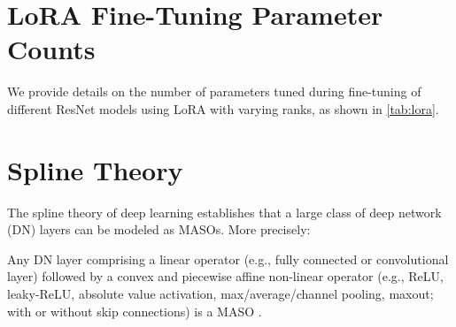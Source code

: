 \section{LoRA Fine-Tuning Parameter Counts}
We provide details on the number of parameters tuned during fine-tuning of different ResNet models using LoRA with varying ranks, as shown in \cref{tab:lora}.

\begin{table}[h]
\caption{\small Number of parameters to be tuned during fine-tuning of different ResNet models (total parameters shown in parentheses) using LoRA with varying ranks. \textbf{While LoRA with low ranks significantly reduces the number of parameters required for fine-tuning, these values still range from tens of thousands to over a million, reinforcing the need for CT in highly resource-constrained scenarios.}}
\label{tab:lora}
\vskip 0.1in
\begin{center}
\begin{small}
\end{small}
\end{center}
\vskip -0.1in
\end{table}

\section{Spline Theory}\label{app:spline-theory}
The spline theory of deep learning establishes that a large class of deep network (DN) layers can be modeled as MASOs. More precisely:
\begin{theorem}
\label{thm:spline}
Any DN layer comprising a linear operator (e.g., fully connected or convolutional layer) followed by a convex and piecewise affine non-linear operator (e.g., ReLU, leaky-ReLU, absolute value activation, max/average/channel pooling, maxout; with or without skip connections) is a MASO \cite{balestriero2018spline}.
\end{theorem}

